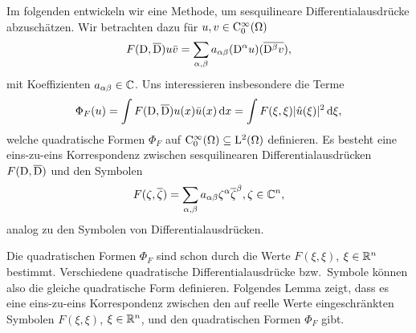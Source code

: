 Im folgenden entwickeln wir eine Methode, um sesquilineare Differentialausdrücke abzuschätzen.
Wir betrachten dazu für $u,v\in\mathrm C_0^\infty(\Omega)$
\begin{equation}
F(\mathrm D,\overline{\mathrm D})u\bar{v}
=\sum_{\alpha,\beta}a_{\alpha\beta}(\mathrm D^\alpha u)(\overline{\mathrm D^\beta v}),
\end{equation}
mit Koeffizienten $a_{\alpha\beta}\in\mathbb C$. Uns interessieren insbesondere die Terme
\begin{equation}\label{eq:2:qf}
\Phi_F(u)=\int F(\mathrm D,\overline{\mathrm D})u(x)\bar{u}(x)\,\mathrm d x
=\int F(\xi,\xi)\lvert\hat{u}(\xi)\rvert^2\,\mathrm d \xi,
\end{equation}
welche quadratische Formen $\Phi_F$ auf $\mathrm C^\infty_0(\Omega)\subseteq \mathrm L^2(\Omega)$
definieren.
Es besteht eine eins-zu-eins Korrespondenz
zwischen sesquilinearen Differentialausdrücken $F(\mathrm D,\overline{\mathrm D})$
und den Symbolen
\begin{equation}
F(\zeta,\overline{\zeta})=\sum_{\alpha,\beta}a_{\alpha\beta}\zeta^\alpha\overline{\zeta}^\beta, \zeta\in\mathbb C^n,
\end{equation}
analog zu den Symbolen von Differentialausdrücken.

Die quadratischen Formen $\Phi_F$
sind schon durch die Werte $F(\xi,\xi)$, $\xi\in\mathbb R^n$ bestimmt.
Verschiedene quadratische Differentialausdrücke bzw.~Symbole
können also die gleiche quadratische Form definieren.
Folgendes Lemma zeigt, dass es eine eins-zu-eins
Korrespondenz zwischen den auf reelle Werte eingeschränkten
Symbolen $F(\xi,\xi)$, $\xi\in\mathbb R^n$,
und den quadratischen Formen $\Phi_F$ gibt.

